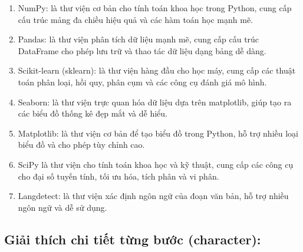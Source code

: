 \begin{enumerate}
    \item NumPy: là thư viện cơ bản cho tính toán khoa học trong Python, cung cấp cấu trúc mảng đa chiều hiệu quả và các hàm toán học mạnh mẽ.
    \item Pandas: là thư viện phân tích dữ liệu mạnh mẽ, cung cấp cấu trúc DataFrame cho phép lưu trữ và thao tác dữ liệu dạng bảng dễ dàng.
    \item Scikit-learn (sklearn): là thư viện hàng đầu cho học máy, cung cấp các thuật toán phân loại, hồi quy, phân cụm và các công cụ đánh giá mô hình.
    \item Seaborn: là thư viện trực quan hóa dữ liệu dựa trên matplotlib, giúp tạo ra các biểu đồ thống kê đẹp mắt và dễ hiểu.
    \item Matplotlib: là thư viện cơ bản để tạo biểu đồ trong Python, hỗ trợ nhiều loại biểu đồ và cho phép tùy chỉnh cao.
    \item SciPy là thư viện cho tính toán khoa học và kỹ thuật, cung cấp các công cụ cho đại số tuyến tính, tối ưu hóa, tích phân và vi phân.
    \item Langdetect: là thư viện xác định ngôn ngữ của đoạn văn bản, hỗ trợ nhiều ngôn ngữ và dễ sử dụng.
\end{enumerate}

\subsection{Giải thích chi tiết từng bước (character):}

